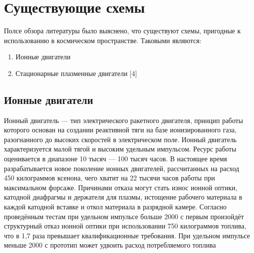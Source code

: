 \documentclass[a4paper,11pt]{article}
\begin{document}
\section{\Large Существующие схемы}

Полсе обзора литературы было выяснено, что существуют схемы, пригодные к использованию в космическом пространстве. Таковыми являются: 
\begin{enumerate}
	\item Ионные двигатели
	\item Стационарные плазменные двигатели [4]
\end{enumerate}
\subsection{Ионные двигатели}
Ионный двигатель — тип электрического ракетного двигателя, принцип работы которого основан на создании реактивной тяги на базе ионизированного газа, разогнанного до высоких скоростей в электрическом поле. 
\newline
Ионный двигатель характеризуется малой тягой и высоким удельным импульсом. Ресурс работы оценивается в диапазоне 10 тысяч — 100 тысяч часов. В настоящее время разрабатывается новое поколение ионных двигателей, рассчитанных на расход 450 килограммов ксенона, чего хватит на 22 тысячи часов работы при максимальном форсаже. Причинами отказа могут стать износ ионной оптики, катодной диафрагмы и держателя для плазмы, истощение рабочего материала в каждой катодной вставке и откол материала в разрядной камере. Согласно проведённым тестам при удельном импульсе больше 2000 с первым произойдёт структурный отказ ионной оптики при использовании 750 килограммов топлива, что в 1,7 раза превышает квалификационные требования. При удельном импульсе меньше 2000 с прототип может удвоить расход потребляемого топлива
\end{document}
